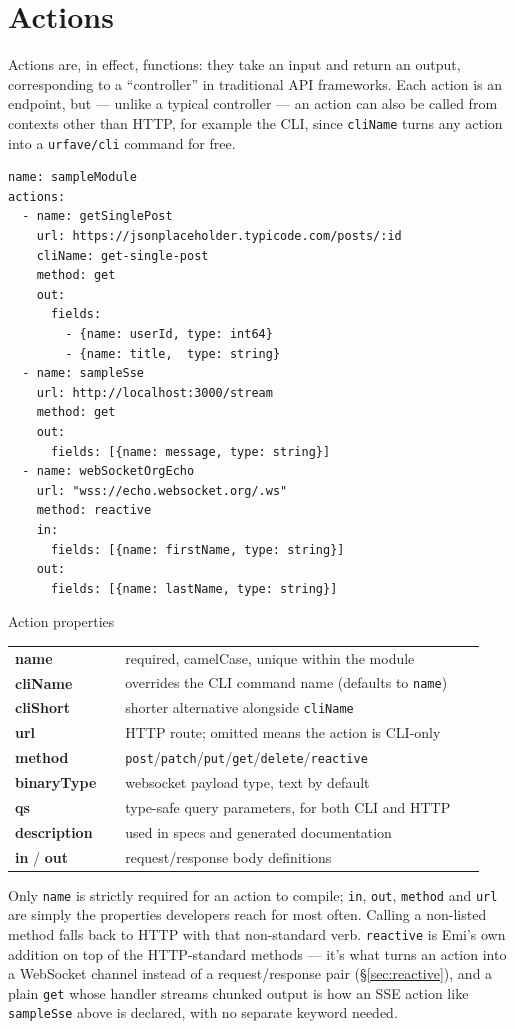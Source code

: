 \section{Actions}
\label{sec:actions}

Actions are, in effect, functions: they take an input and return an
output, corresponding to a ``controller'' in traditional API frameworks.
Each action is an endpoint, but --- unlike a typical controller --- an
action can also be called from contexts other than HTTP, for example the
CLI, since \texttt{cliName} turns any action into a \texttt{urfave/cli}
command for free.

\begin{lstlisting}
name: sampleModule
actions:
  - name: getSinglePost
    url: https://jsonplaceholder.typicode.com/posts/:id
    cliName: get-single-post
    method: get
    out:
      fields:
        - {name: userId, type: int64}
        - {name: title,  type: string}
  - name: sampleSse
    url: http://localhost:3000/stream
    method: get
    out:
      fields: [{name: message, type: string}]
  - name: webSocketOrgEcho
    url: "wss://echo.websocket.org/.ws"
    method: reactive
    in:
      fields: [{name: firstName, type: string}]
    out:
      fields: [{name: lastName, type: string}]
\end{lstlisting}

\begin{sidebar}{Action properties}
\small
\begin{tabular}{@{}p{0.22\linewidth}p{0.72\linewidth}@{}}
\textbf{name} & required, camelCase, unique within the module \\
\textbf{cliName} & overrides the CLI command name (defaults to \texttt{name}) \\
\textbf{cliShort} & shorter alternative alongside \texttt{cliName} \\
\textbf{url} & HTTP route; omitted means the action is CLI-only \\
\textbf{method} & \texttt{post}/\texttt{patch}/\texttt{put}/\texttt{get}/\texttt{delete}/\texttt{reactive} \\
\textbf{binaryType} & websocket payload type, text by default \\
\textbf{qs} & type-safe query parameters, for both CLI and HTTP \\
\textbf{description} & used in specs and generated documentation \\
\textbf{in} / \textbf{out} & request/response body definitions \\
\end{tabular}
\end{sidebar}

Only \texttt{name} is strictly required for an action to compile;
\texttt{in}, \texttt{out}, \texttt{method} and \texttt{url} are simply the
properties developers reach for most often. Calling a non-listed method
falls back to HTTP with that non-standard verb. \texttt{reactive} is
Emi's own addition on top of the HTTP-standard methods --- it's what
turns an action into a WebSocket channel instead of a request/response
pair (\S\ref{sec:reactive}), and a plain \texttt{get} whose handler
streams chunked output is how an SSE action like \texttt{sampleSse} above
is declared, with no separate keyword needed.
